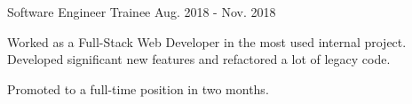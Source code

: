 \begin{cventries}
  \cventry
    {Software Engineer Trainee} %
    {} %
    {} %
    {Aug. 2018 - Nov. 2018} %
    {
      \begin{cvitems} %
        \item {Worked as a Full-Stack Web Developer in the most used internal project. Developed significant new features and refactored a lot of legacy code.}
        \item {Promoted to a full-time position in two months.}
      \end{cvitems}
    }


\end{cventries}
